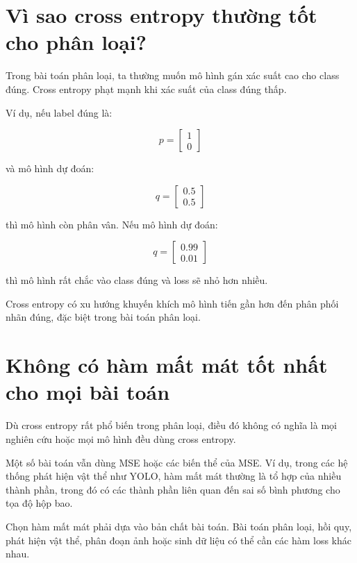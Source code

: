 \documentclass[12pt,a4paper]{report}
\begin{document}
\section{Vì sao cross entropy thường tốt cho phân loại?}

Trong bài toán phân loại, ta thường muốn mô hình gán xác suất cao cho class đúng. Cross entropy phạt mạnh khi xác suất của class đúng thấp.

Ví dụ, nếu label đúng là:

\[
    p =
    \begin{bmatrix}
    1\\0
    \end{bmatrix}
\]

và mô hình dự đoán:

\[
    q =
    \begin{bmatrix}
    0.5\\0.5
    \end{bmatrix}
\]

thì mô hình còn phân vân. Nếu mô hình dự đoán:

\[
    q =
    \begin{bmatrix}
    0.99\\0.01
    \end{bmatrix}
\]

thì mô hình rất chắc vào class đúng và loss sẽ nhỏ hơn nhiều.

\begin{ghinho}
Cross entropy có xu hướng khuyến khích mô hình tiến gần hơn đến phân phối nhãn đúng, đặc biệt trong bài toán phân loại.
\end{ghinho}

\section{Không có hàm mất mát tốt nhất cho mọi bài toán}

Dù cross entropy rất phổ biến trong phân loại, điều đó không có nghĩa là mọi nghiên cứu hoặc mọi mô hình đều dùng cross entropy.

Một số bài toán vẫn dùng MSE hoặc các biến thể của MSE. Ví dụ, trong các hệ thống phát hiện vật thể như YOLO, hàm mất mát thường là tổ hợp của nhiều thành phần, trong đó có các thành phần liên quan đến sai số bình phương cho tọa độ hộp bao.

\begin{luuy}
Chọn hàm mất mát phải dựa vào bản chất bài toán. Bài toán phân loại, hồi quy, phát hiện vật thể, phân đoạn ảnh hoặc sinh dữ liệu có thể cần các hàm loss khác nhau.
\end{luuy}
\end{document}

